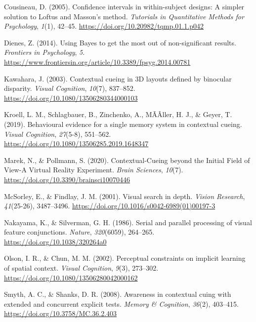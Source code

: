 \documentclass[
  man,floatsintext]{apa7}
\newlength{\cslhangindent}
\newlength{\cslentryspacingunit} %
\newenvironment{CSLReferences}[2] %
 {%
  \setlength{\parindent}{0pt}
  \ifodd #1
  \let\oldpar\par
  \def\par{\hangindent=\cslhangindent\oldpar}
  \fi
  \setlength{\parskip}{#2\cslentryspacingunit}
 }%
 {}
\begin{document}
\begin{CSLReferences}{1}{0}
\leavevmode{}%
Cousineau, D. (2005). Confidence intervals in within-subject designs: {A} simpler solution to {Loftus} and {Masson}'s method. \emph{Tutorials in Quantitative Methods for Psychology}, \emph{1}(1), 42--45. \url{https://doi.org/10.20982/tqmp.01.1.p042}

\leavevmode{}%
Dienes, Z. (2014). Using {Bayes} to get the most out of non-significant results. \emph{Frontiers in Psychology}, \emph{5}. \url{https://www.frontiersin.org/article/10.3389/fpsyg.2014.00781}

\leavevmode{}%
Kawahara, J. (2003). Contextual cueing in {3D} layouts defined by binocular disparity. \emph{Visual Cognition}, \emph{10}(7), 837--852. \url{https://doi.org/10.1080/13506280344000103}

\leavevmode{}%
Kroell, L. M., Schlagbauer, B., Zinchenko, A., MÃÂller, H. J., \& Geyer, T. (2019). Behavioural evidence for a single memory system in contextual cueing. \emph{Visual Cognition}, \emph{27}(5-8), 551--562. \url{https://doi.org/10.1080/13506285.2019.1648347}

\leavevmode{}%
Marek, N., \& Pollmann, S. (2020). Contextual-{Cueing} beyond the {Initial Field} of {View}-{A Virtual Reality Experiment}. \emph{Brain Sciences}, \emph{10}(7). \url{https://doi.org/10.3390/brainsci10070446}

\leavevmode{}%
McSorley, E., \& Findlay, J. M. (2001). Visual search in depth. \emph{Vision Research}, \emph{41}(25-26), 3487--3496. \url{https://doi.org/10.1016/s0042-6989(01)00197-3}

\leavevmode{}%
Nakayama, K., \& Silverman, G. H. (1986). Serial and parallel processing of visual feature conjunctions. \emph{Nature}, \emph{320}(6059), 264--265. \url{https://doi.org/10.1038/320264a0}

\leavevmode{}%
Olson, I. R., \& Chun, M. M. (2002). Perceptual constraints on implicit learning of spatial context. \emph{Visual Cognition}, \emph{9}(3), 273--302. \url{https://doi.org/10.1080/13506280042000162}

\leavevmode{}%
Smyth, A. C., \& Shanks, D. R. (2008). Awareness in contextual cuing with extended and concurrent explicit tests. \emph{Memory \& Cognition}, \emph{36}(2), 403--415. \url{https://doi.org/10.3758/MC.36.2.403}


\end{CSLReferences}
\end{document}
